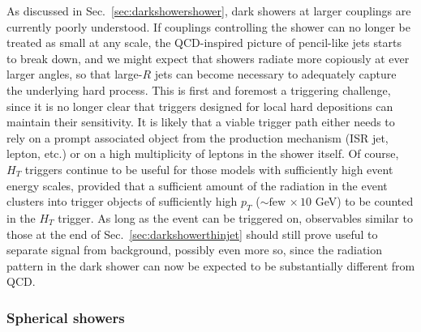 As discussed in Sec.~\ref{sec:darkshowershower}, dark showers at larger couplings are currently poorly understood. If couplings controlling the shower can no longer be treated as small at any scale, the QCD-inspired picture of pencil-like jets starts to break down, and we might expect that showers radiate more copiously at ever larger angles, so that large-$R$ jets can become necessary to adequately capture the underlying hard process. This is first and foremost a triggering challenge, since it is no longer clear that triggers designed for local hard depositions can maintain their sensitivity. It is likely that a viable trigger path either needs to rely on a prompt associated object from the production mechanism (ISR jet, lepton, etc.) or on a high multiplicity of leptons in the shower itself. Of course,  $H_T$ triggers continue to be useful for those models with sufficiently high event energy scales, provided that a sufficient amount of the radiation in the event clusters into trigger objects of sufficiently high $p_T$ ($\sim\mathrm{few \,}\times 10$ GeV) to be counted in the $H_T$ trigger. As long as the event can be triggered on, observables similar to those at the end of Sec.~\ref{sec:darkshowerthinjet} should still prove useful to separate signal from background, possibly even more so, since the radiation pattern in the dark shower can now be expected to be substantially different from QCD.

\subsubsection{Spherical showers} %

